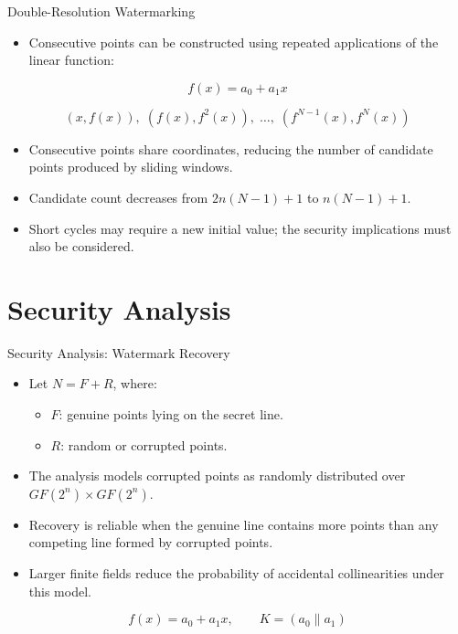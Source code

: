 \documentclass[xcolor=dvipsnames,aspectratio=169]{beamer}
\begin{document}
	\begin{frame}{Double-Resolution Watermarking}
		\begin{itemize}
			\item Consecutive points can be constructed using
			repeated applications of the linear function:
		\end{itemize}
		
		\[
		f(x)=a_0+a_1x
		\]
		
		\[
		(x,f(x)),\;
		(f(x),f^2(x)),\;\ldots,\;
		(f^{N-1}(x),f^N(x))
		\]
		
		\begin{itemize}
			\item Consecutive points share coordinates, reducing
			the number of candidate points produced by sliding
			windows.
			
			\item Candidate count decreases from
			$2n(N-1)+1$ to $n(N-1)+1$.
			
			\item Short cycles may require a new initial value;
			the security implications must also be considered.
		\end{itemize}
	\end{frame}
	
	\section{Security Analysis}
	\begin{frame}{Security Analysis: Watermark Recovery}
		\begin{itemize}
			\item Let $N=F+R$, where:
			\begin{itemize}
				\item $F$: genuine points lying on the secret line.
				\item $R$: random or corrupted points.
			\end{itemize}
			\item The analysis models corrupted points as randomly distributed over $GF(2^n)\times GF(2^n)$.
			\item Recovery is reliable when the genuine line contains more points than any competing line formed by corrupted points.
			\item Larger finite fields reduce the probability of accidental collinearities under this model.
		\end{itemize}
		\vspace{0.15cm}
		\[
		f(x)=a_0+a_1x,\qquad K=(a_0\parallel a_1)
		\]
	\end{frame}
	
\end{document}
